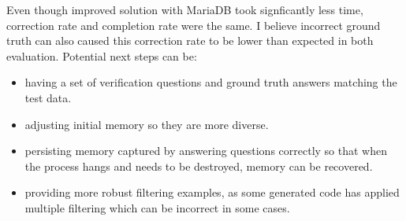 \documentclass[acmsmall]{acmart}
\begin{document}
Even though improved solution with MariaDB took signficantly less time, correction rate and completion rate were the same. 
I believe incorrect ground truth can also caused this correction rate to be lower than expected in both evaluation. 
Potential next steps can be:  
\begin{itemize}
  \item having a set of verification questions and ground truth answers matching the test data.
  \item adjusting initial memory so they are more diverse.
  \item persisting memory captured by answering questions correctly so that when the process hangs and needs to be destroyed, memory can be recovered.
  \item providing more robust filtering examples, as some generated code has applied multiple filtering which can be incorrect in some cases.
\end{itemize}



\end{document}
